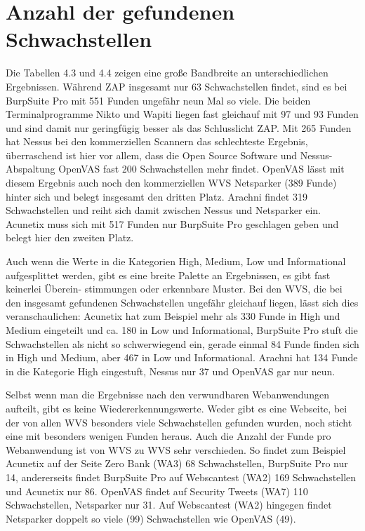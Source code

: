 \documentclass[12pt,oneside,a4paper,parskip,pointlessnumbers]{scrbook}
\begin{document}
  \section{Anzahl der gefundenen Schwachstellen}
  Die Tabellen 4.3 und 4.4 zeigen eine große Bandbreite an unterschiedlichen Ergebnissen. Während ZAP insgesamt nur 63 Schwachstellen findet, sind es bei BurpSuite Pro mit 551 Funden ungefähr neun Mal so viele. Die beiden Terminalprogramme Nikto und Wapiti liegen fast gleichauf mit 97 und 93 Funden und sind damit nur geringfügig besser als das Schlusslicht ZAP.
  Mit 265 Funden hat Nessus bei den kommerziellen Scannern das schlechteste Ergebnis, überraschend ist hier vor allem, dass die Open Source Software und Nessus-Abspaltung OpenVAS fast 200 Schwachstellen mehr findet.
  OpenVAS lässt mit diesem Ergebnis auch noch den kommerziellen WVS Netsparker (389 Funde) hinter sich und belegt insgesamt den dritten Platz. Arachni findet 319 Schwachstellen und reiht sich damit zwischen Nessus und Netsparker ein. Acunetix muss sich mit 517 Funden nur BurpSuite Pro geschlagen geben und belegt hier den zweiten Platz.

  Auch wenn die Werte in die Kategorien High, Medium, Low und Informational aufgesplittet werden, gibt es eine breite Palette an Ergebnissen, es gibt fast keinerlei Überein- stimmungen oder erkennbare Muster. Bei den WVS, die bei den insgesamt gefundenen Schwachstellen ungefähr gleichauf liegen, lässt sich dies veranschaulichen: Acunetix hat zum Beispiel mehr als 330 Funde in High und Medium eingeteilt und ca. 180 in Low und Informational, BurpSuite Pro stuft die Schwachstellen als nicht so schwerwiegend ein,  gerade einmal 84 Funde finden sich in High und Medium, aber 467 in Low und Informational. Arachni hat 134 Funde in die Kategorie High eingestuft, Nessus nur 37 und OpenVAS gar nur neun.

  Selbst wenn man die Ergebnisse nach den verwundbaren Webanwendungen aufteilt, gibt es keine Wiedererkennungswerte. Weder gibt es eine Webseite, bei der von allen WVS besonders viele Schwachstellen gefunden wurden, noch sticht eine mit besonders wenigen Funden heraus. Auch die Anzahl der Funde pro Webanwendung ist von WVS zu WVS sehr verschieden. So findet zum Beispiel Acunetix auf der Seite Zero Bank (WA3) 68 Schwachstellen, BurpSuite Pro nur 14, andererseits findet BurpSuite Pro auf Webscantest (WA2) 169 Schwachstellen und Acunetix nur 86. OpenVAS findet auf Security Tweets (WA7) 110 Schwachstellen, Netsparker nur 31. Auf Webscantest (WA2) hingegen findet Netsparker doppelt so viele (99) Schwachstellen wie OpenVAS (49).
\end{document}
